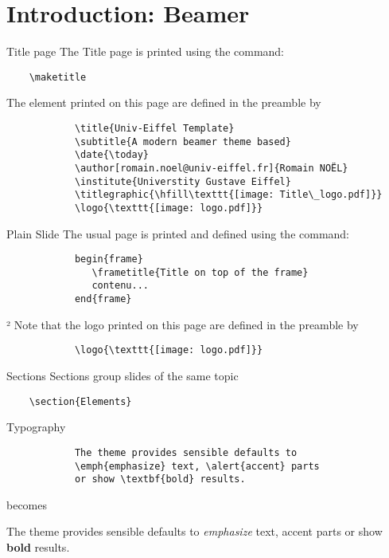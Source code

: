 \section{Introduction: Beamer}

	\begin{frame}[fragile]{Title page}
		The Title page is printed using the command:			
		\begin{verbatim}    \maketitle\end{verbatim}
		
		The element printed on this page are defined in the preamble by
		\begin{verbatim}
			\title{Univ-Eiffel Template}
			\subtitle{A modern beamer theme based}
			\date{\today}
			\author[romain.noel@univ-eiffel.fr]{Romain NOËL}
			\institute{Universtity Gustave Eiffel}
			\titlegraphic{\hfill\texttt{[image: Title\_logo.pdf]}}
			\logo{\texttt{[image: logo.pdf]}}
		\end{verbatim}
	\end{frame}
	
	\begin{frame}[fragile]{Plain Slide}
		The usual page is printed and defined using the command:			
		\begin{verbatim}
			begin{frame}
			   \frametitle{Title on top of the frame}
			   contenu...
			end{frame}
		\end{verbatim}
		²
		Note that the logo printed on this page are defined in the preamble by
		\begin{verbatim}
			\logo{\texttt{[image: logo.pdf]}}
		\end{verbatim}
	\end{frame}

	\begin{frame}[fragile]{Sections}
		Sections group slides of the same topic
		
		\begin{verbatim}    \section{Elements}\end{verbatim}
	\end{frame}

	\begin{frame}[fragile]{Typography}
		\begin{verbatim}
			The theme provides sensible defaults to
			\emph{emphasize} text, \alert{accent} parts
			or show \textbf{bold} results.
		\end{verbatim}
		
		\begin{center}becomes\end{center}
		
		The theme provides sensible defaults to \emph{emphasize} text,
		\alert{accent} parts or show \textbf{bold} results.
	\end{frame}
		
